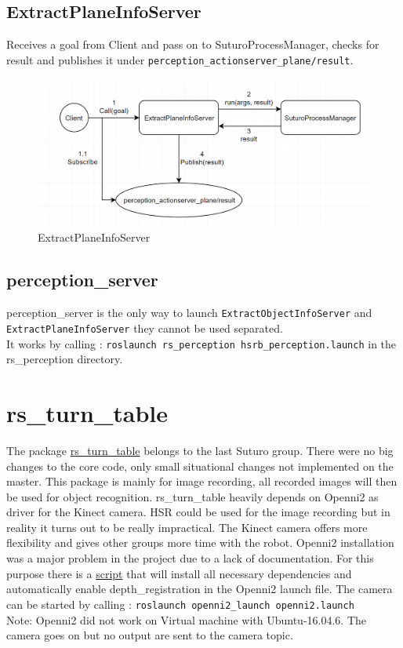 \documentclass[main.tex]{subfiles}
\begin{document}
			\subsection{ExtractPlaneInfoServer}
Receives a goal from Client and pass on to SuturoProcessManager, checks for result and publishes it under \texttt{perception\_actionserver\_plane/result}.
			\begin{figure}[H]
   			 \centering
    			 \includegraphics[width=1\textwidth]{pictures/perception/suturo_ExtractPlaneInfoServer.png}
   			 \caption{ExtractPlaneInfoServer}
  			\end{figure}

			\subsection{perception\_server}
perception\_server is the only way to launch \texttt{ExtractObjectInfoServer} and \texttt{ExtractPlaneInfoServer} they cannot be used separated. \\
It works by calling : \texttt{roslaunch rs\_perception hsrb\_perception.launch} in the rs\_perception directory.

		\section{rs\_turn\_table}
The package \href{https://github.com/Vanessa-rin/rs_turn_table}{rs\_turn\_table} belongs to the last Suturo group. There were no big changes to the core code, only small situational changes not implemented on the master. 
This package is mainly for image recording, all recorded images will then be used for object recognition.  
rs\_turn\_table heavily depends on Openni2 as driver for the Kinect camera. HSR could be used for the image recording but in reality it turns out to be really impractical. 
The Kinect camera offers more flexibility and gives other groups more time with the robot. Openni2 installation was a major problem in the project due to a lack of documentation. For this purpose there is a 
\href{https://github.com/SUTURO/suturo_perception/blob/Openni2/Openni2/Openni2_Install}{script} that will install all necessary dependencies and automatically enable depth\_registration in the Openni2 launch file. The camera can be started by calling : \texttt{roslaunch openni2\_launch openni2.launch}
 \\ Note: Openni2 did not work on Virtual machine with Ubuntu-16.04.6. The camera goes on but no output are sent to the camera topic. 
\end{document}
